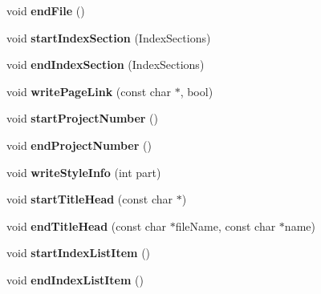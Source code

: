 \begin{DoxyCompactItemize}
void {\bfseries end\+File} ()
\item 
\mbox{\label{class_docbook_generator_a9480c35ad416cf8f5e5024fc666d82f2}} 
void {\bfseries start\+Index\+Section} (Index\+Sections)
\item 
\mbox{\label{class_docbook_generator_a5cd5a531e4b38a90801a4d5577df9ef7}} 
void {\bfseries end\+Index\+Section} (Index\+Sections)
\item 
\mbox{\label{class_docbook_generator_aacc408198549c392c851a1825fd700c7}} 
void {\bfseries write\+Page\+Link} (const char $\ast$, bool)
\item 
\mbox{\label{class_docbook_generator_a50ce1f94515c49874020c1ad07ff0e5a}} 
void {\bfseries start\+Project\+Number} ()
\item 
\mbox{\label{class_docbook_generator_ae1453894e89e42261578f657d47f9d52}} 
void {\bfseries end\+Project\+Number} ()
\item 
\mbox{\label{class_docbook_generator_a99bbec3723074f8b343e9cc7c09f76c2}} 
void {\bfseries write\+Style\+Info} (int part)
\item 
\mbox{\label{class_docbook_generator_a221a9c15d2b41349a43ec5acae2e017d}} 
void {\bfseries start\+Title\+Head} (const char $\ast$)
\item 
\mbox{\label{class_docbook_generator_a8b3fe6b030f4d1a6aac307c54c2e526f}} 
void {\bfseries end\+Title\+Head} (const char $\ast$file\+Name, const char $\ast$name)
\item 
\mbox{\label{class_docbook_generator_ad145679e6d0f1729c54f0de06ddd1440}} 
void {\bfseries start\+Index\+List\+Item} ()
\item 
\mbox{\label{class_docbook_generator_a205e8526c572a3bc41d634bf57dd1e93}} 
void {\bfseries end\+Index\+List\+Item} ()
\item 
\mbox{\label{class_docbook_generator_a925d42f1449375a424ba30f57c11f4f4}} 

\end{DoxyCompactItemize}

